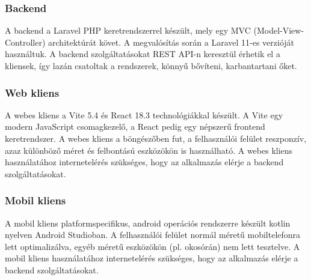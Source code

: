 \subsubsection{Backend}

A backend a Laravel PHP keretrendszerrel \cite{LaravelDocs} készült, mely egy MVC (Model-View-Controller) architektúrát követ. A megvalósítás során a Laravel 11-es verzióját használtuk. A backend szolgáltatásokat REST API-n keresztül érhetik el a kliensek, így lazán csatoltak a rendszerek, könnyű bővíteni, karbantartani őket.

\subsubsection{Web kliens}
A webes kliens a Vite 5.4 és React 18.3 technológiákkal készült. A Vite egy modern JavaScript csomagkezelő, a React pedig egy népszerű frontend keretrendszer. A webes kliens a böngészőben fut, a felhasználói felület reszponzív, azaz különböző méret és felbontású eszközökön is használható. A webes kliens használatához internetelérés szükséges, hogy az alkalmazás elérje a backend szolgáltatásokat.

\subsubsection{Mobil kliens}
A mobil kliens platformspecifikus, android operációs rendszerre készült kotlin nyelven Android Studioban.
A felhasználói felület normál méretű mobiltelefonra lett optimalizálva, egyéb méretű eszközökön (pl. okosórán) nem lett tesztelve.
A mobil kliens használatához internetelérés szükséges, hogy az alkalmazás elérje a backend szolgáltatásokat. 